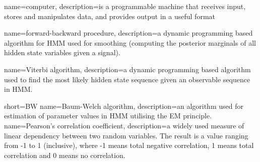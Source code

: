 %
%
%
{
	name=computer,
	description={is a programmable machine that receives input,
		stores and manipulates data, and provides
		output in a useful format}
}

{
	name={forward-backward procedure},
	description={a dynamic programming based algorithm for HMM used for smoothing (computing the posterior marginals of all hidden state variables given a signal).}
}

{
	name={Viterbi algorithm},
	description={a dynamic programming based algorithm used to find the most likely hidden state sequence given an observable sequence in HMM.}
}
	
{
	short={BW}
	name={Baum-Welch algorithm},
	description={an algorithm used for estimation of parameter values in HMM utilising the EM principle.}
}
{
	name={Pearson's correlation coefficient},
	description={a widely used measure of linear dependency between two random variables. The result is a value ranging from -1 to 1 (inclusive), where -1 means total negative correlation, 1 means total correlation and 0 means no correlation.}
}

%
%
%
%
%

%
%
%
